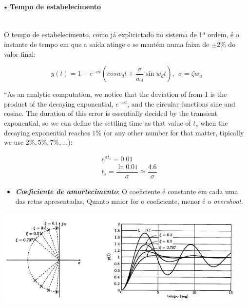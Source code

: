 \paragraph[2.1.3.3 Tempo de estabelecimento]{$\pmb{\star}$ Tempo de estabelecimento}\mbox{}\\

\noindent O tempo de estabelecimento, como já explicictado no sistema de 1ª ordem, é o instante de tempo em que a saída atinge e se mantém numa faixa de $\pm 2\%$ do valor final:

$$
    y(t) = 1 - e^{-\sigma t}\left(cos w_d t + \dfrac{\sigma}{w_d}\sin w_d t\right),\;\, \sigma = \zeta w_n
$$

\noindent ``As an analytic computation, we notice that the deviation of from 1 is the product of the decaying exponential, $e^{-\sigma t}$, and the circular functions sine and cosine. The duration of this error is essentially decided by the transient exponential, so we can define the settling time as
that value of $t_s$ when the decaying exponential reaches $1\%$ (or any other number for that matter, tipically we use $2\%, 5\%, 7\%, \dots$):

$$
    \begin{aligned}
        &e^{\sigma t_s} = 0.01\\
        &t_s = \dfrac{\ln{0.01}}{\sigma} \simeq \dfrac{4.6}{\sigma}
    \end{aligned}
$$

\begin{center}
    \begin{minipage}{0.45\textwidth}
        \begin{itemize}[leftmargin=*]
        \item[] \textbf{\emph{Coeficiente de amortecimento}}: O coeficiente é constante em cada uma das retas apresentadas. Quanto maior for o coeficiente, menor é o \textit{overshoot}.
        \end{itemize}
    \end{minipage}%
    \hfill
    \begin{minipage}{0.55\textwidth}
        \begin{center}
            \includegraphics[width=0.95\textwidth]{img/2/overshoot.png}
            \label{img:overshoot}
        \end{center}
    \end{minipage}
\end{center}


